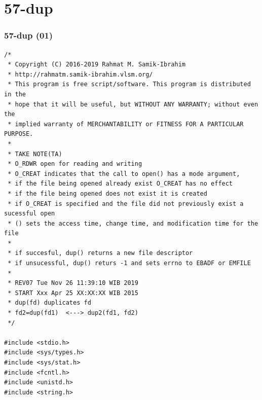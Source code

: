 \documentclass[xcolor=table, notheorems, hyperref={pdfpagelabels=false}]{beamer}
\begin{document}
\section{57-dup}
\begin{frame}[fragile]
\frametitle{57-dup (01)}
\begin{lstlisting}[basicstyle=\ttfamily\tiny]
/*
 * Copyright (C) 2016-2019 Rahmat M. Samik-Ibrahim
 * http://rahmatm.samik-ibrahim.vlsm.org/
 * This program is free script/software. This program is distributed in the 
 * hope that it will be useful, but WITHOUT ANY WARRANTY; without even the 
 * implied warranty of MERCHANTABILITY or FITNESS FOR A PARTICULAR PURPOSE.
 *
 * TAKE NOTE(TA)
 * O_RDWR open for reading and writing
 * O_CREAT indicates that the call to open() has a mode argument,
 * if the file being opened already exist O_CREAT has no effect
 * if the file being opened does not exist it is created
 * if O_CREAT is specified and the file did not previously exist a sucessful open
 * () sets the access time, change time, and modification time for the file
 *
 * if succesful, dup() returns a new file descriptor
 * if unsucessful, dup() returs -1 and sets errno to EBADF or EMFILE
 * 
 * REV07 Tue Nov 26 11:39:10 WIB 2019
 * START Xxx Apr 25 XX:XX:XX WIB 2015
 * dup(fd) duplicates fd
 * fd2=dup(fd1)  <---> dup2(fd1, fd2)
 */

#include <stdio.h>
#include <sys/types.h>
#include <sys/stat.h>
#include <fcntl.h>
#include <unistd.h>
#include <string.h>

\end{lstlisting}
\end{frame}
\end{document}
